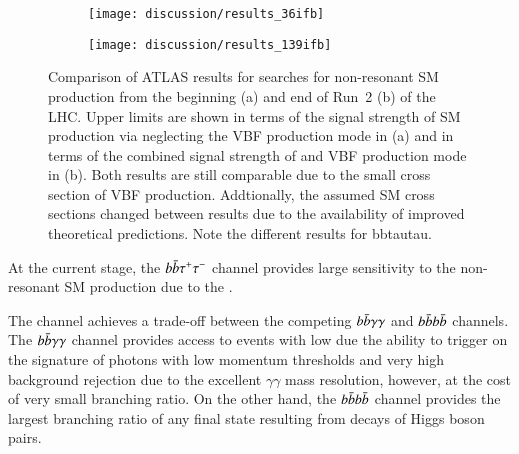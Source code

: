 \begin{figure}[htbp]
  \centering

  \begin{subfigure}[b]{0.53\textwidth}
    \texttt{[image: discussion/results\_36ifb]}
  \end{subfigure}\hfill%
  \begin{subfigure}[b]{0.46\textwidth}
    \texttt{[image: discussion/results\_139ifb]}
  \end{subfigure}

  \caption{Comparison of ATLAS results for searches for non-resonant
    SM \HH production from the beginning (a) and end of Run~2 (b) of
    the LHC. Upper limits are shown in terms of the signal strength of
    SM \HH production via \ggF neglecting the VBF production mode in
    (a) and in terms of the combined signal strength of \ggF and VBF
    production mode in (b). Both results are still comparable due to
    the small cross section of VBF \HH production. Addtionally, the
    assumed SM \HH cross sections changed between results due to the
    availability of improved theoretical predictions.  Note the
    different results for bbtautau. }
  \label{fig:atlas_run2_hh_results}
\end{figure}

\begin{table}[htbp]
  \centering

  

  \caption{Table of CMS results of searches for non-resonant
    production of Higgs boson pairs with an integrated luminosity of
    \SI{138}{\per\femto\barn}. Upper limits are shown at
    \SI{95}{\percent} CL on the signal strength of the combination of
    the \ggF and VBF production modes.}
  \label{tab:cms_nonresonant}
\end{table}

At the current stage, the $b\bar{b}\tau^{+}\tau^{-}$ channel provides
large sensitivity to the non-resonant SM \HH production due to the .

The \bbtautau channel achieves a trade-off between the competing
$b\bar{b}\gamma\gamma$ and $b\bar{b}b\bar{b}$ channels. The
$b\bar{b}\gamma\gamma$ channel provides access to events with low \mHH
due the ability to trigger on the signature of photons with low
momentum thresholds and very high background rejection due to the
excellent $\gamma\gamma$ mass resolution, however, at the cost of very
small branching ratio. On the other hand, the $b\bar{b}b\bar{b}$ channel
provides the largest branching ratio of any final state resulting from
decays of Higgs boson pairs.

